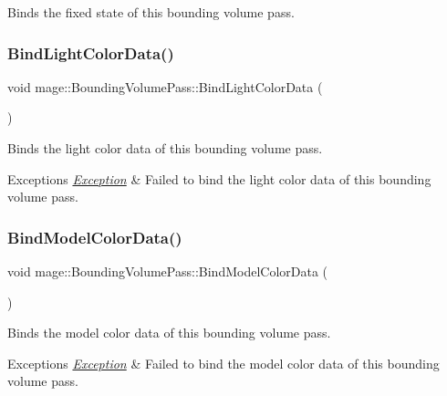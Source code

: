 Binds the fixed state of this bounding volume pass. \hypertarget{classmage_1_1_bounding_volume_pass_a9dcca637d98ea8335777094d3d994f5c}{}\label{classmage_1_1_bounding_volume_pass_a9dcca637d98ea8335777094d3d994f5c} 
\subsubsection{\texorpdfstring{Bind\+Light\+Color\+Data()}{BindLightColorData()}}
{\footnotesize\ttfamily void mage\+::\+Bounding\+Volume\+Pass\+::\+Bind\+Light\+Color\+Data (\begin{DoxyParamCaption}{ }\end{DoxyParamCaption})\hspace{0.3cm}{\ttfamily [private]}}

Binds the light color data of this bounding volume pass.


\begin{DoxyExceptions}{Exceptions}
{\em \hyperlink{classmage_1_1_exception}{Exception}} & Failed to bind the light color data of this bounding volume pass. \\
\hline
\end{DoxyExceptions}
\hypertarget{classmage_1_1_bounding_volume_pass_af4591758a8dfa7cd19a0f87a0273e470}{}\label{classmage_1_1_bounding_volume_pass_af4591758a8dfa7cd19a0f87a0273e470} 
\subsubsection{\texorpdfstring{Bind\+Model\+Color\+Data()}{BindModelColorData()}}
{\footnotesize\ttfamily void mage\+::\+Bounding\+Volume\+Pass\+::\+Bind\+Model\+Color\+Data (\begin{DoxyParamCaption}{ }\end{DoxyParamCaption})\hspace{0.3cm}{\ttfamily [private]}}

Binds the model color data of this bounding volume pass.


\begin{DoxyExceptions}{Exceptions}
{\em \hyperlink{classmage_1_1_exception}{Exception}} & Failed to bind the model color data of this bounding volume pass. \\
\hline
\end{DoxyExceptions}
\hypertarget{classmage_1_1_bounding_volume_pass_ae84dd1e056235a5fdbc7c496b6b99d1d}{}\label{classmage_1_1_bounding_volume_pass_ae84dd1e056235a5fdbc7c496b6b99d1d} 
